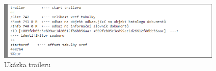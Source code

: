 \begin{itemize}
\begin{itemize}
	\end{itemize}
	\begin{figure}[h!]
	\centering
	\includegraphics[width=12cm]{img/pdf_trailer}
	\caption{Ukázka traileru}
	\label{fig:pdf_trailer}
	\end{figure}
\end{itemize}